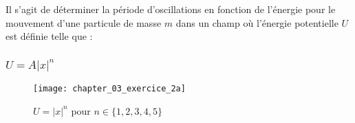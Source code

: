 Il s'agit de d\'eterminer la p\'eriode d'oscillations en fonction de l'\'energie pour le mouvement d'une particule de masse $m$ dans un champ o\`u l'\'energie potentielle $U$ est d\'efinie telle que :

\subsubsection{$U = A\lvert x \rvert^{n}$}

\begin{figure}[htb!]
	\begin{center}
		\texttt{[image: chapter\_03\_exercice\_2a]}
		\caption{$U = \lvert x \rvert^{n}$ pour $n \in \{1,2,3,4,5\}$}\label{FIG:3_2_a}
	\end{center}
\end{figure}

